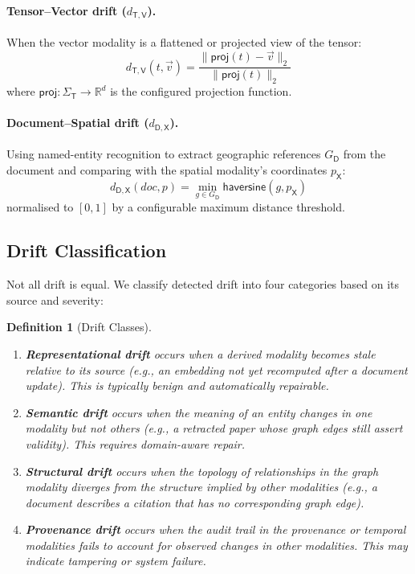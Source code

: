 \documentclass[11pt,twocolumn]{article}
\newtheorem{definition}{Definition}[section]
\begin{document}
\paragraph{Tensor--Vector drift ($d_{\mathsf{T},\mathsf{V}}$).}
When the vector modality is a flattened or projected view of the tensor:
\[
  d_{\mathsf{T},\mathsf{V}}(t, \vec{v}) =
    \frac{\|\mathsf{proj}(t) - \vec{v}\|_2}{\|\mathsf{proj}(t)\|_2}
\]
where $\mathsf{proj} : \Sigma_\mathsf{T} \to \mathbb{R}^d$ is the configured
projection function.

\paragraph{Document--Spatial drift ($d_{\mathsf{D},\mathsf{X}}$).}
Using named-entity recognition to extract geographic references $G_\mathsf{D}$
from the document and comparing with the spatial modality's coordinates
$p_\mathsf{X}$:
\[
  d_{\mathsf{D},\mathsf{X}}(\mathit{doc}, p) =
    \min_{g \in G_\mathsf{D}} \mathsf{haversine}(g, p_\mathsf{X})
\]
normalised to $[0, 1]$ by a configurable maximum distance threshold.

\subsection{Drift Classification}\label{sec:drift-class}

Not all drift is equal.  We classify detected drift into four categories
based on its source and severity:

\begin{definition}[Drift Classes]\label{def:drift-classes}
\begin{enumerate}[leftmargin=*]
  \item \textbf{Representational drift} occurs when a derived modality
    becomes stale relative to its source (e.g., an embedding not yet
    recomputed after a document update).  This is typically benign and
    automatically repairable.
  \item \textbf{Semantic drift} occurs when the meaning of an entity
    changes in one modality but not others (e.g., a retracted paper whose
    graph edges still assert validity).  This requires domain-aware repair.
  \item \textbf{Structural drift} occurs when the topology of
    relationships in the graph modality diverges from the structure implied
    by other modalities (e.g., a document describes a citation that has
    no corresponding graph edge).
  \item \textbf{Provenance drift} occurs when the audit trail in the
    provenance or temporal modalities fails to account for observed changes
    in other modalities.  This may indicate tampering or system failure.
\end{enumerate}
\end{definition}
\end{document}
